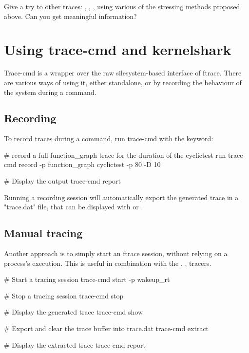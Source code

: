 Give a try to other traces: , , ,
using various of the stressing methods proposed above. Can you get meaningful information?

\section{Using trace-cmd and kernelshark}

Trace-cmd is a wrapper over the raw silesystem-based interface of ftrace. There
are various ways of using it, either standalone, or by recording the behaviour
of the system during a command.

\subsection{Recording}

To record traces during a command, run trace-cmd with the  keyword:

\begin{bashinput}
# record a full function_graph trace for the duration of the cyclictest run
trace-cmd record -p function_graph cyclictest -p 80 -D 10

# Display the output
trace-cmd report
\end{bashinput}

Running a recording session will automatically export the generated trace in a
"trace.dat" file, that can be displayed with  or .

\subsection{Manual tracing}

Another approach is to simply start an ftrace session, without relying on a process's
execution. This is useful in combination with the , ,  tracers.

\begin{bashinput}
	# Start a tracing session
	trace-cmd start -p wakeup_rt

	# Stop a tracing session
	trace-cmd stop

	# Display the generated trace
	trace-cmd show

	# Export and clear the trace buffer into trace.dat
	trace-cmd extract

	# Display the extracted trace
	trace-cmd report
\end{bashinput}

